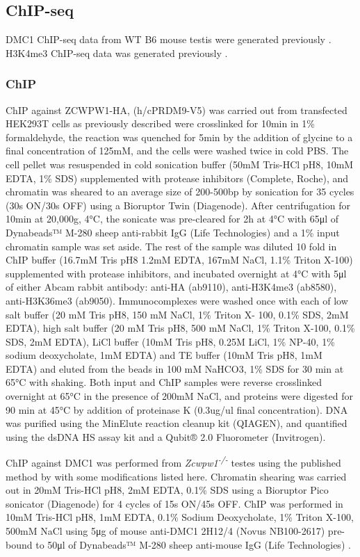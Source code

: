 \subsection{ChIP-seq}
\label{sec:chip}
DMC1 ChIP-seq data from WT B6 mouse testis were generated previously \parencite{Brick2012Genetic}.
H3K4me3 ChIP-seq data was generated previously \parencite{Davies2016Reengineering}.

\subsubsection{ChIP}
ChIP against ZCWPW1-HA, (h/cPRDM9-V5) was carried out from transfected HEK293T cells as previously described \parencite{Davies2016Reengineering, Altemose2017map} were crosslinked for 10min in 1\% formaldehyde, the reaction was quenched for 5min by the addition of glycine to a final concentration of 125mM, and the cells were washed twice in cold PBS.
The cell pellet was resuspended in cold sonication buffer (50mM Tris-HCl pH8, 10mM EDTA, 1\% SDS) supplemented with protease inhibitors (Complete, Roche), and chromatin was sheared to an average size of 200-500bp by sonication for 35 cycles (30s ON/30s OFF) using a Bioruptor Twin (Diagenode).
After centrifugation for 10min at 20,000g, 4°C, the sonicate was pre-cleared for 2h at 4°C with 65μl of Dynabeads™ M-280 sheep anti-rabbit IgG (Life Technologies) and a 1\% input chromatin sample was set aside.
The rest of the sample was diluted 10 fold in ChIP buffer (16.7mM Tris pH8 1.2mM EDTA, 167mM NaCl, 1.1\% Triton X-100) supplemented with protease inhibitors, and incubated overnight at 4°C with 5μl of either Abcam rabbit antibody: anti-HA (ab9110), anti-H3K4me3 (ab8580), anti-H3K36me3 (ab9050).
Immunocomplexes were washed once with each of low salt buffer (20 mM Tris pH8, 150 mM NaCl, 1\% Triton X- 100, 0.1\% SDS, 2mM EDTA), high salt buffer (20 mM Tris pH8, 500 mM NaCl, 1\% Triton X-100, 0.1\% SDS, 2mM EDTA), LiCl buffer (10mM Tris pH8, 0.25M LiCl, 1\% NP-40, 1\% sodium deoxycholate, 1mM EDTA) and TE buffer (10mM Tris pH8, 1mM EDTA) and eluted from the beads in 100 mM NaHCO3, 1\% SDS for 30 min at 65°C with shaking.
Both input and ChIP samples were reverse crosslinked overnight at 65°C in the presence of 200mM NaCl, and proteins were digested for 90 min at 45°C by addition of proteinase K (0.3ug/ul final concentration).
DNA was purified using the MinElute reaction cleanup kit (QIAGEN), and quantified using the dsDNA HS assay kit and a Qubit® 2.0 Fluorometer (Invitrogen).

ChIP against DMC1 was performed from \textit{Zcwpw1\textsuperscript{-/-}} testes using the published method by \parencite{Khil2012Sensitive} with some modifications listed here.
Chromatin shearing was carried out in 20mM Tris-HCl pH8, 2mM EDTA, 0.1\% SDS using a Bioruptor Pico sonicator (Diagenode) for 4 cycles of 15s ON/45s OFF.
ChIP was performed in 10mM Tris-HCl pH8, 1mM EDTA, 0.1\% Sodium Deoxycholate, 1\% Triton X-100, 500mM NaCl using 5μg of mouse anti-DMC1 2H12/4 (Novus NB100-2617) pre-bound to 50μl of Dynabeads™ M-280 sheep anti-mouse IgG (Life Technologies) .

